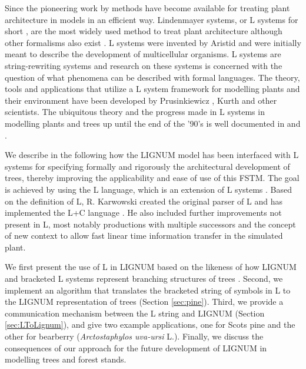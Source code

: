 Since  the pioneering  work  by \citet{honda:71}  methods have  become
available for  treating plant architecture  in models in  an efficient
way.  Lindenmayer  systems, or L systems for  short \citep{pp:89}, are
the most widely used method to treat plant architecture although other
formalisms   also  exist  \citep[e.g.][]{dereffye:97,   godin:99}.   L
systems    were    invented    by    Aristid    \citet{lindenmayer:68,
  lindenmayer:71} and were initially meant to describe the development
of  multicellular organisms.  L  systems are  string-rewriting systems
and research on  these systems is concerned with  the question of what
phenomena can  be described with formal languages.   The theory, tools
and  applications that  utilize  a L  system  framework for  modelling
plants  and their  environment  have been  developed by  Prusinkiewicz
\citep{pp:89,pp:92}, Kurth \citep{kurth:94} and other scientists.  The
ubiquitous  theory and  the progress  made in  L systems  in modelling
plants and trees  up until the end of the '90's  is well documented in
\citet{pp:90,pp:99} and \citet{kurth:99}.

We describe in the following  how the LIGNUM model has been interfaced
with   L  systems   for   specifying  formally   and  rigorously   the
architectural   development   of    trees,   thereby   improving   the
applicability and ease  of use of this FSTM.  The  goal is achieved by
using  the   L  language,   which  is  an   extension  of   L  systems
\citep{pp:99a}.  Based  on the definition of L,  R.  Karwowski created
the  original  parser  of  L  and has  implemented  the  L+C  language
\citep{karwowski:02}.  He  also   included  further  improvements  not
present in  L, most notably  productions with multiple  successors and
the concept  of new context \citep{karwowski:03} to  allow fast linear
time information transfer in the simulated plant.

We first present the  use of L in LIGNUM based on  the likeness of how
LIGNUM and bracketed L systems represent branching structures of trees
\citep{perttunen:96, perttunen:01}.  Second, we implement an algorithm
that translates  the bracketed  string of symbols  in L to  the LIGNUM
representation of trees (Section \ref{sec:pine}).  Third, we provide a
communication  mechanism  between the  L  string  and LIGNUM  (Section
\ref{sec:LToLignum}), and give two example applications, one for Scots
pine  and the  other for  bearberry  (\textit{Arctostaphylos uva-ursi}
L.).  Finally,  we discuss  the consequences of  our approach  for the
future development of LIGNUM in modelling trees and forest stands.

